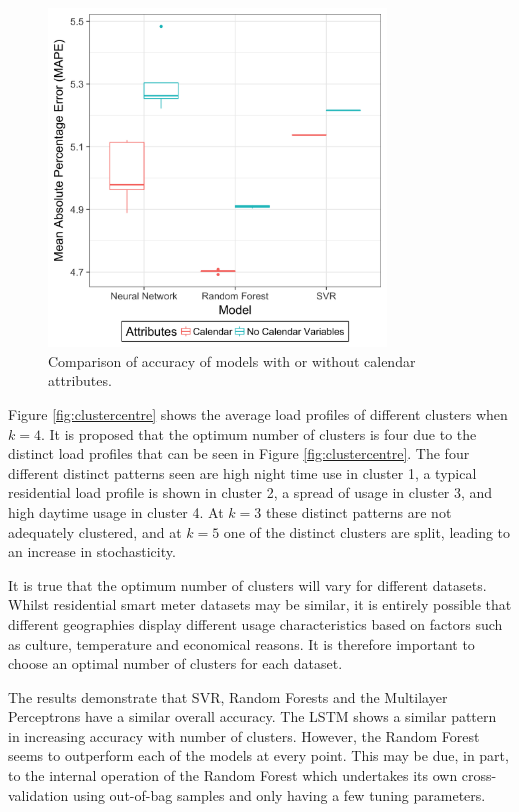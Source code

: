 \begin{figure}
	\includegraphics[width=0.8\textwidth]{Chapter5/figures/short-term-forecasting/calendar_attr.png}
	\caption{Comparison of accuracy of models with or without calendar attributes.}
	\label{fig:calendar_attr}
\end{figure}



Figure \ref{fig:clustercentre} shows the average load profiles of different clusters when $k=4$. It is proposed that the optimum number of clusters is four due to the distinct load profiles that can be seen in Figure \ref{fig:clustercentre}. The four different distinct patterns seen are high night time use in cluster 1, a typical residential load profile is shown in cluster 2, a spread of usage in cluster 3, and high daytime usage in cluster 4. At $k=3$ these distinct patterns are not adequately clustered, and at $k=5$ one of the distinct clusters are split, leading to an increase in stochasticity.

It is true that the optimum number of clusters will vary for different datasets. Whilst residential smart meter datasets may be similar, it is entirely possible that different geographies display different usage characteristics based on factors such as culture, temperature and economical reasons. It is therefore important to choose an optimal number of clusters for each dataset.

The results demonstrate that SVR, Random Forests and the Multilayer Perceptrons have a similar overall accuracy. The LSTM shows a similar pattern in increasing accuracy with number of clusters. However, the Random Forest seems to outperform each of the models at every point. This may be due, in part, to the internal operation of the Random Forest which undertakes its own cross-validation using out-of-bag samples and only having a few tuning parameters. 

